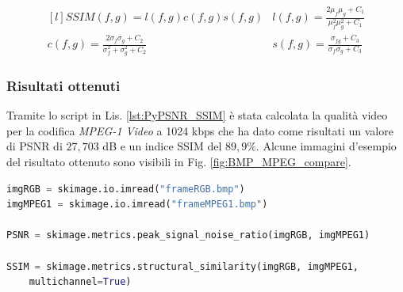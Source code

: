 \begin{equation} \label{eq:SSIM}
	\begin{matrix*}[l]
		SSIM(f,g) =  l(f,g) c(f,g) s(f,g) & l(f,g)= \frac{2 \mu_f \mu_g  + C_1}{\mu_f^2 \mu_g^2  + C_1} \\
		c(f,g)= \frac{2 \sigma_f \sigma_g  + C_2}{\sigma_f^2 + \sigma_g^2  + C_2} & s(f,g)= \frac{\sigma_{fg}+C_3}{\sigma_f \sigma_g + C_3}
	\end{matrix*}
\end{equation}



\subsubsection{Risultati ottenuti}
Tramite lo script in Lis. \ref{lst:PyPSNR_SSIM} è stata calcolata la qualità video per la codifica \textit{MPEG-1 Video} a 1024 kbps che ha dato come risultati un valore di PSNR di $27,703$ \si{dB} e un indice SSIM del $89,9\%$. Alcune immagini d'esempio del risultato ottenuto sono visibili in Fig. \ref{fig:BMP_MPEG_compare}.

\begin{lstlisting}[language=Python, caption=Script Python per il calcolo di PSNR e SSIM, label={lst:PyPSNR_SSIM}]
imgRGB = skimage.io.imread("frameRGB.bmp")
imgMPEG1 = skimage.io.imread("frameMPEG1.bmp")

PSNR = skimage.metrics.peak_signal_noise_ratio(imgRGB, imgMPEG1)

SSIM = skimage.metrics.structural_similarity(imgRGB, imgMPEG1,
	multichannel=True)
\end{lstlisting}

